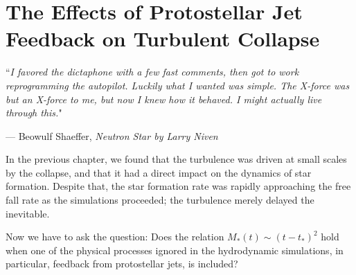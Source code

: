 \documentclass[../dissertation.tex]{subfiles}
\begin{document}
\chapter[Jet Feedback in Star Formation]{The Effects of Protostellar Jet Feedback on Turbulent Collapse}
\label{ch:jet}


\singlespace
\epigraph{``\emph{I favored the dictaphone with a few fast comments, then got to work reprogramming the autopilot. Luckily what I wanted was simple. The X-force was but an X-force to me, but now I knew how it behaved. I might actually live through this.}"}{--- \textup{Beowulf Shaeffer}, \textit{Neutron Star by Larry Niven}}

\dblspace

%
In the previous chapter, we found that the turbulence was driven at small scales by the collapse, and that it  had a direct impact on the dynamics of star formation. Despite that, the star formation rate was rapidly approaching the free fall rate as the simulations proceeded; the turbulence merely delayed the inevitable.

Now we have to ask the question: Does the relation $M_*(t)\sim (t-t_*)^2$ hold when one of the physical processes ignored in the hydrodynamic simulations, in particular, feedback from protostellar jets, is included? 
\end{document}

